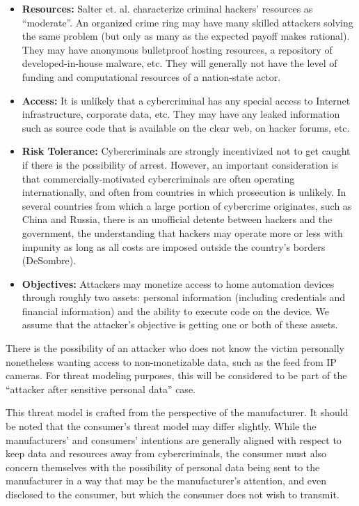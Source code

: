 \begin{itemize}
\item {\bf Resources:} Salter et. al. characterize criminal hackers’ resources as “moderate”. An organized crime ring may have many skilled attackers solving the same problem (but only as many as the expected payoff makes rational). They may have anonymous bulletproof hosting resources, a repository of developed-in-house malware, etc. They will generally not have the level of funding and computational resources of a nation-state actor.
\item {\bf Access:} It is unlikely that a cybercriminal has any special access to Internet infrastructure, corporate data, etc. They may have any leaked information such as source code that is available on the clear web, on hacker forums, etc.
\item {\bf Risk Tolerance:} Cybercriminals are strongly incentivized not to get caught if there is the possibility of arrest. However, an important consideration is that commercially-motivated cybercriminals are often operating internationally, and often from countries in which prosecution is unlikely. In several countries from which a large portion of cybercrime originates, such as China and Russia, there is an unofficial detente between hackers and the government, the understanding that hackers may operate more or less with impunity as long as all costs are imposed outside the country’s borders (DeSombre).
\item {\bf Objectives:} Attackers may monetize access to home automation devices through roughly two assets: personal information (including credentials and financial information) and the ability to execute code on the device. We assume that the attacker’s objective is getting one or both of these assets.
\end{itemize}

There is the possibility of an attacker who does not know the victim personally nonetheless wanting access to non-monetizable data, such as the feed from IP cameras. For threat modeling purposes, this will be considered to be part of the “attacker after sensitive personal data” case.

This threat model is crafted from the perspective of the manufacturer. It should be noted that the consumer’s threat model may differ slightly. While the manufacturers’ and consumers’ intentions are generally aligned with respect to keep data and resources away from cybercriminals, the consumer must also concern themselves with the possibility of personal data being sent to the manufacturer in a way that may be the manufacturer’s attention, and even disclosed to the consumer, but which the consumer does not wish to transmit.

